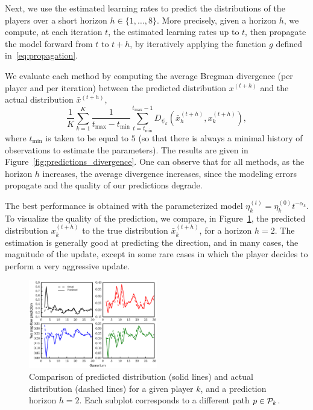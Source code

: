 \documentclass{sig-alternate-ipsn13}
\begin{document}
Next, we use the estimated learning rates to predict the distributions of the players over a short horizon $h \in \{1, \dots, 8\}$. More precisely, given a horizon $h$, we compute, at each iteration $t$, the estimated learning rates up to $t$, then propagate the model forward from $t$ to $t+h$, by iteratively applying the function $g$ defined in~\eqref{eq:propagation}. 

We evaluate each method by computing the average Bregman divergence (per player and per iteration) between the predicted distribution $x^{(t+h)}$ and the actual distribution $\bar x^{(t+h)}$,
\[
\frac{1}{K} \sum_{k = 1}^K \frac{1}{t_{\max} - t_{\min}} \sum_{t = t_{\min}}^{t_{\max}-1} D_{\psi_k} (\bar x^{(t+h)}_h, x^{(t+h)}_k),
\]
where $t_{\min}$ is taken to be equal to $5$ (so that there is always a minimal history of observations to estimate the parameters). The results are given in Figure~\ref{fig:predictions_divergence}. One can observe that for all methods, as the horizon $h$ increases, the average divergence increases, since the modeling errors propagate and the quality of our predictions degrade.

The best performance is obtained with the parameterized model $\eta^{(t)}_k = \eta^{(0)}_k t^{-\alpha_k}$. To visualize the quality of the prediction, we compare, in Figure~\ref{fig:parameterized}, the predicted distribution $x^{(t+h)}_k$ to the true distribution $\bar x^{(t+h)}_k$, for a horizon $h = 2$. The estimation is generally good at predicting the direction, and in many cases, the magnitude of the update, except in some rare cases in which the player decides to perform a very aggressive update.

\begin{figure}[h]
  \centering
  \includegraphics[width=0.5\textwidth]{images/two_steps_predictions}
  \caption{\footnotesize Comparison of predicted distribution (solid lines) and actual distribution (dashed lines) for a given player $k$, and a prediction horizon $h = 2$. Each subplot corresponds to a different path $p \in \mathcal{P}_k$.}
  \label{fig:parameterized}
\end{figure}
\end{document}

